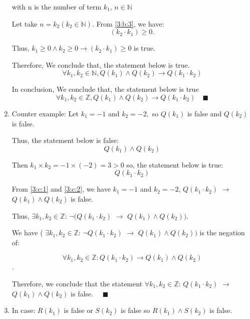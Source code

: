 \documentclass{article}
\renewcommand{\a}{\land}
\newcommand{\n}{\neg}
\begin{document}
\begin{enumerate}[label=({\alph*})]
		with n is the number of term $k_{1}$, $n \in \mathbb{N}$
		
		Let take $n = k_{2} (k_2 \in \mathbb{N})$. From \eqref{3:b:3}, we have:
		 $$(k_{2} \cdot k_{1}) \geq 0.$$ 
		
		Thus,  $k_{1} \geq 0  \a  k_{2} \geq 0  \to (k_{2} \cdot k_{1}) \geq 0$ is true.

		Therefore, We conclude that, the statement below is true.
		\begin{equation}
		  \forall k_{1}, k_{2} \in \mathbb{N}, Q(k_{1}) \a Q(k_{2}) \to Q(k_{1} \cdot k_{2}) 
		\end{equation}

		In conclusion, We conclude that, the statement below is true
		\begin{equation}
		  \forall k_{1}, k_{2} \in \mathbb{Z},  Q(k_{1}) \a Q(k_{2}) \to Q(k_{1} \cdot k_{2}) \quad \blacksquare 
		\end{equation}


		\item	Counter example: Let $ k_{1} = -1 $ and $ k_{2} = -2, $ so $Q(k_{1})$ is false and $Q(k_{2})$ is false. 
	
		Thus, the statement below is false:
		\begin{equation}
			Q(k_{1}) \a Q(k_{2}) \label{3:c:1}
		\end{equation}

	
		Then $k_{1} \times k_{2} = -1 \times (-2) = 3 > 0 $ so, the statement below is true:
		\begin{equation}
		  Q(k_{1} \cdot k_{2}) \label{3:c:2}
		\end{equation}
	
		From \eqref{3:c:1} and \eqref{3:c:2}, we have $k_{1} = -1 $ and $ k_{2} = -2$, $ Q(k_{1} \cdot k_{2})$ $ \to $ $Q(k_{1}) \a Q(k_{2})$ is false. 
		 
		Thus, $\exists k_{1}, k_{2} \in \mathbb{Z}$:  $ \n(Q(k_{1} \cdot k_{2})$ $ \to $ $Q(k_{1}) \a Q(k_{2}))$.
	
		 We have ( $\exists k_{1}, k_{2} \in \mathbb{Z}$:  $ \n Q(k_{1} \cdot k_{2})$ $ \to $ $Q(k_{1}) \a Q(k_{2}) )$ is the negation of:

		  $$ \forall k_{1}, k_{2} \in \mathbb{Z}:   Q(k_{1} \cdot k_{2})  \to Q(k_{1}) \a Q(k_{2})$$.
	
		Therefore, we conclude that the statement  $ \forall k_{1}, k_{2} \in \mathbb{Z}$:  $ Q(k_{1} \cdot k_{2})$ $ \to $ $Q(k_{1}) \a Q(k_{2})$ is false. \(\quad \blacksquare\)

		\item In case: $R({k_1}) $ is false or $S({k_2})$ is false so $R({k_1}) \a  S({k_2}) $ is false.
	

\end{enumerate}
\end{document}
